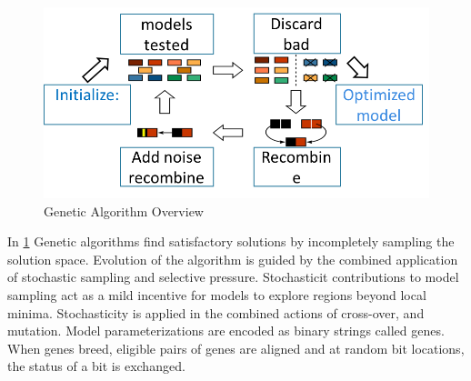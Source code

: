\begin{center}
\begin{figure}

    \includegraphics[width=0.7\linewidth]{figures/How_Genetic_Alg_Works.png}
  \caption{Genetic Algorithm Overview}
  \label{fig:GeneticAlgOver}
\end{figure}
  
\end{center}

In \ref{fig:GeneticAlgOver}  Genetic algorithms find satisfactory solutions by incompletely sampling the solution space. Evolution of the algorithm is guided by the combined application of stochastic sampling and selective pressure. Stochasticit contributions to model sampling act as a mild incentive for models to explore regions beyond local minima. Stochasticity is applied in the combined actions of cross-over, and mutation. Model parameterizations are encoded as binary strings called genes. When genes breed, eligible pairs of genes are aligned and at random bit locations, the status of a bit is exchanged.  


